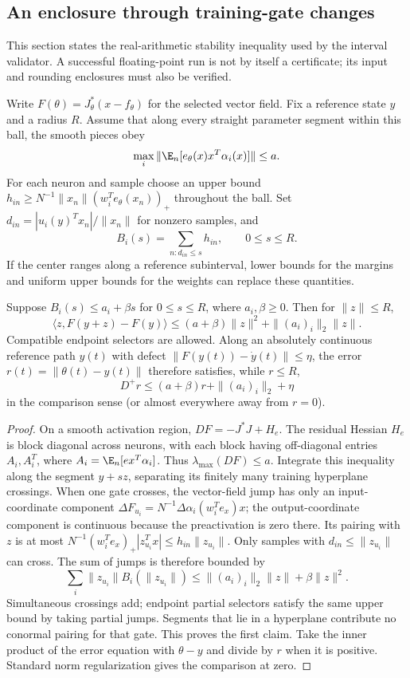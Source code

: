 \subsection{An enclosure through training-gate changes}
This section states the real-arithmetic stability inequality used by the
interval validator. A successful floating-point run is not by
itself a certificate; its input and rounding enclosures must also be verified.

Write $F(\theta)=J_\theta^*(x-f_\theta)$ for the selected vector field.
Fix a reference state $y$ and a radius $R$. Assume that along every straight
parameter segment within this ball, the smooth pieces obey
\[
 \max_i\|\E_n[e_\theta(x)x^T\alpha_i(x)]\|\le a.
\]
For each neuron and sample choose an upper bound
$h_{in}\ge N^{-1}\|x_n\|(w_i^Te_\theta(x_n))_+$ throughout the ball.
Set $d_{in}=|u_i(y)^Tx_n|/\|x_n\|$ for nonzero samples, and
\[
 B_i(s)=\sum_{n:d_{in}\le s}h_{in},\qquad 0\le s\le R.
\]
If the center ranges along a reference subinterval, lower bounds for the
margins and uniform upper bounds for the weights can replace these quantities.

\begin{lemma}\label{initcert:tube}
Suppose $B_i(s)\le a_i+\beta s$ for $0\le s\le R$, where $a_i,\beta\ge0$.
Then for $\|z\|\le R$,
\[
 \langle z,F(y+z)-F(y)\rangle
 \le(a+\beta)\|z\|^2+\|(a_i)_i\|_2\|z\|.
\]
Compatible endpoint selectors are allowed. Along an absolutely continuous
reference path $y(t)$ with defect $\|F(y(t))-\dot y(t)\|\le\eta$, the
error $r(t)=\|\theta(t)-y(t)\|$ therefore satisfies, while $r\le R$,
\[
 D^+r\le(a+\beta)r+\|(a_i)_i\|_2+\eta
\]
in the comparison sense (or almost everywhere away from $r=0$).
\end{lemma}
\begin{proof}
On a smooth activation region,
$DF=-J^*J+H_e$. The residual Hessian $H_e$ is block diagonal across
neurons, with each block having off-diagonal entries $A_i,A_i^T$, where
$A_i=\E_n[e x^T\alpha_i]$. Thus $\lambda_{\max}(DF)\le a$.
Integrate this inequality along the segment $y+sz$, separating its finitely
many training hyperplane crossings. When one gate crosses, the vector-field
jump has only an input-coordinate component
$\Delta F_{u_i}=N^{-1}\Delta\alpha_i(w_i^Te_x)x$; the output-coordinate
component is continuous because the preactivation is zero there. Its pairing
with $z$ is at most
$N^{-1}(w_i^Te_x)_+|z_{u_i}^Tx|\le h_{in}\|z_{u_i}\|$.
Only samples with $d_{in}\le\|z_{u_i}\|$ can cross. The sum of jumps is
therefore bounded by
\[
 \sum_i\|z_{u_i}\|B_i(\|z_{u_i}\|)
 \le\|(a_i)_i\|_2\|z\|+\beta\|z\|^2.
\]
Simultaneous crossings add; endpoint partial selectors satisfy the same
upper bound by taking partial jumps. Segments that lie in a hyperplane
contribute no conormal pairing for that gate. This proves the first claim.
Take the inner product of the error equation with $\theta-y$ and divide
by $r$ when it is positive. Standard norm regularization gives the comparison
at zero.
\end{proof}


